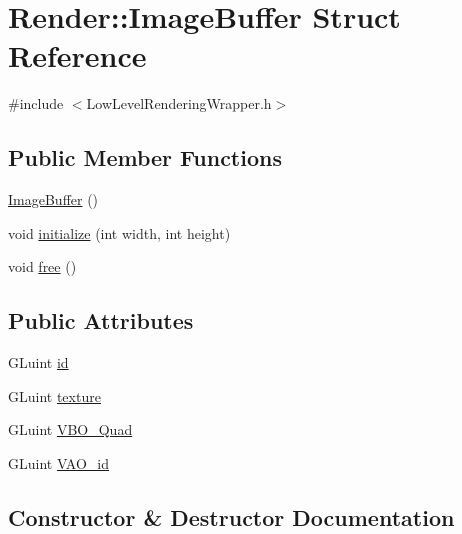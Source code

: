\hypertarget{struct_render_1_1_image_buffer}{}\section{Render\+:\+:Image\+Buffer Struct Reference}
\label{struct_render_1_1_image_buffer}


{\ttfamily \#include $<$Low\+Level\+Rendering\+Wrapper.\+h$>$}

\subsection*{Public Member Functions}
\begin{DoxyCompactItemize}
\item 
\hyperlink{struct_render_1_1_image_buffer_ae079b86576f411129ecf5dfced95ebc3}{Image\+Buffer} ()
\item 
void \hyperlink{struct_render_1_1_image_buffer_a0b9a717f2db8215561405b6cd267f718}{initialize} (int width, int height)
\item 
void \hyperlink{struct_render_1_1_image_buffer_acab6a406219c5239d540b7f7f8e92f82}{free} ()
\end{DoxyCompactItemize}
\subsection*{Public Attributes}
\begin{DoxyCompactItemize}
\item 
G\+Luint \hyperlink{struct_render_1_1_image_buffer_a47f5f937bf7825fdcd4015a3fee19af7}{id}
\item 
G\+Luint \hyperlink{struct_render_1_1_image_buffer_aee9977f1b19294be10824b796ead1c42}{texture}
\item 
G\+Luint \hyperlink{struct_render_1_1_image_buffer_a2686e946f9d48ee451d628536a74afb6}{V\+B\+O\+\_\+\+Quad}
\item 
G\+Luint \hyperlink{struct_render_1_1_image_buffer_aca7c5ea5e5d4acece47d101675d50f4c}{V\+A\+O\+\_\+id}
\end{DoxyCompactItemize}


\subsection{Constructor \& Destructor Documentation}
